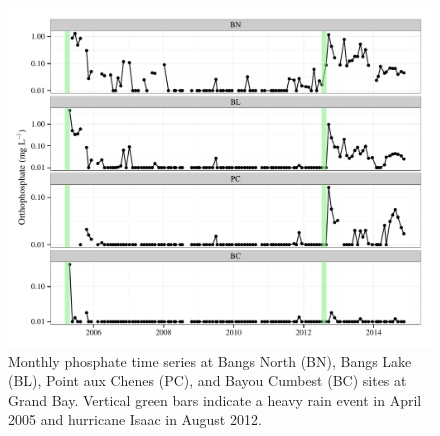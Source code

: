 \documentclass[letterpaper,12pt]{article}\usepackage[]{graphicx}\usepackage[]{color}
\makeatletter
\def\maxwidth{ %
  \ifdim\Gin@nat@width>\linewidth
    \linewidth
  \else
    \Gin@nat@width
  \fi
}
\makeatother
\begin{document}
\begin{figure}[!ht]

{\centering \includegraphics[width=\maxwidth]{figs/orthtsfig-1} 

}

\caption[Monthly phosphate time series at Bangs North (BN), Bangs Lake (BL), Point aux Chenes (PC), and Bayou Cumbest (BC) sites at Grand Bay]{Monthly phosphate time series at Bangs North (BN), Bangs Lake (BL), Point aux Chenes (PC), and Bayou Cumbest (BC) sites at Grand Bay. Vertical green bars indicate a heavy rain event in April 2005 and hurricane Isaac in August 2012.}\label{fig:orthtsfig}
\end{figure}


\clearpage
\end{document}
